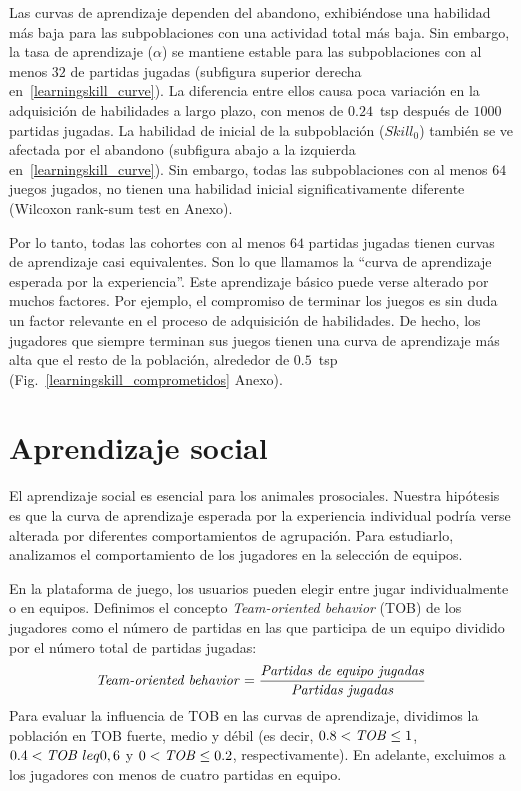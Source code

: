 \documentclass[a4paper,11pt]{book}
\theoremstyle{definition}
\begin{document}
Las curvas de aprendizaje dependen del abandono, exhibi\'endose una habilidad m\'as baja para las subpoblaciones con una actividad total m\'as baja.
%
Sin embargo, la tasa de aprendizaje ($\alpha$) se mantiene estable para las subpoblaciones con al menos $32$ de partidas jugadas (subfigura superior derecha en~\ref{learningskill_curve}).
%
La diferencia entre ellos causa poca variaci\'on en la adquisici\'on de habilidades a largo plazo, con menos de $0.24$~tsp despu\'es de $1000$ partidas jugadas.
%
La habilidad de inicial de la subpoblaci\'on ($Skill_0$) tambi\'en se ve afectada por el abandono (subfigura abajo a la izquierda en~\ref{learningskill_curve}).
%
Sin embargo, todas las subpoblaciones con al menos $64$ juegos jugados, no tienen una habilidad inicial significativamente diferente (Wilcoxon rank-sum test en Anexo).


Por lo tanto, todas las cohortes con al menos $64$ partidas jugadas tienen curvas de aprendizaje casi equivalentes.
%
Son lo que llamamos la ``curva de aprendizaje esperada por la experiencia''.
%
Este aprendizaje b\'asico puede verse alterado por muchos factores.
%
Por ejemplo, el compromiso de terminar los juegos es sin duda un factor relevante en el proceso de adquisici\'on de habilidades.
%
De hecho, los jugadores que siempre terminan sus juegos tienen una curva de aprendizaje m\'as alta que el resto de la poblaci\'on, alrededor de $0.5$~tsp (Fig.~\ref{learningskill_comprometidos} Anexo).

\section{Aprendizaje social}

El aprendizaje social es esencial para los animales prosociales.
%
Nuestra hip\'otesis es que la curva de aprendizaje esperada por la experiencia individual podr\'ia verse alterada por diferentes comportamientos de agrupaci\'on.
%
Para estudiarlo, analizamos el comportamiento de los jugadores en la selecci\'on de equipos.


En la plataforma de juego, los usuarios pueden elegir entre jugar individualmente o en equipos.
%
Definimos el concepto \emph{Team-oriented behavior} (TOB) de los jugadores como el n\'umero de partidas en las que participa de un equipo dividido por el n\'umero total de partidas jugadas:
%
\begin{equation}
\text{\emph{Team-oriented behavior}} = \frac{\text{\emph{Partidas de equipo jugadas}}}{\text{\emph{Partidas jugadas}}}
\end{equation}
%
Para evaluar la influencia de TOB en las curvas de aprendizaje, dividimos la poblaci\'on en TOB fuerte, medio y d\'ebil (es decir, $0.8<\text{\emph{TOB}}\leq 1$, $0.4 <\text{\emph{TOB}}\ leq 0,6$ y $0 <\text{\emph{TOB}}\leq 0.2$, respectivamente).
%
En adelante, excluimos a los jugadores con menos de cuatro partidas en equipo.
\end{document}
